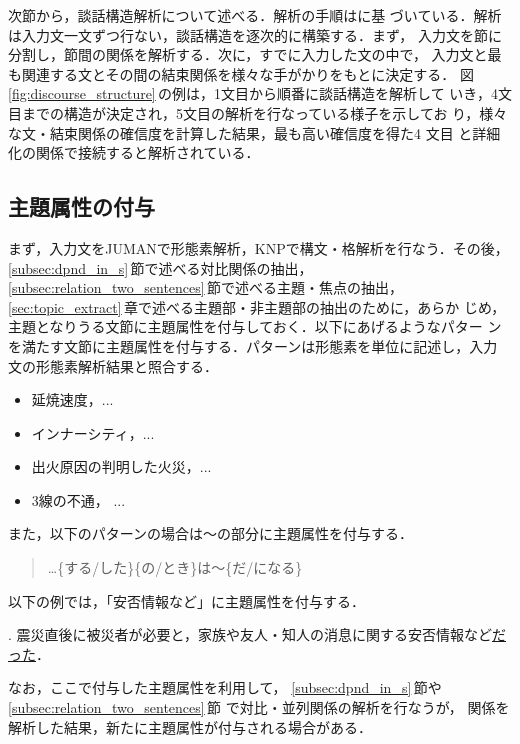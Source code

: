 \vspace{5mm}

次節から，談話構造解析について述べる．解析の手順は\cite{Kurohashi94j}に基
づいている．解析は入力文一文ずつ行ない，談話構造を逐次的に構築する．まず，
入力文を節に分割し，節間の関係を解析する．次に，すでに入力した文の中で，
入力文と最も関連する文とその間の結束関係を様々な手がかりをもとに決定する．
図\ref{fig:discourse_structure}\,の例は，1文目から順番に談話構造を解析して
いき，4文目までの構造が決定され，5文目の解析を行なっている様子を示してお
り，様々な文・結束関係の確信度を計算した結果，最も高い確信度を得た4 文目
と詳細化の関係で接続すると解析されている．


\subsection{主題属性の付与}
\label{subsec:topic_feature}

まず，入力文をJUMANで形態素解析，KNPで構文・格解析を行なう．その後，
\ref{subsec:dpnd_in_s}\,節で述べる対比関係の抽出，
\ref{subsec:relation_two_sentences}\,節で述べる主題・焦点の抽出，
\ref{sec:topic_extract}\,章で述べる主題部・非主題部の抽出のために，あらか
じめ，主題となりうる文節に主題属性を付与しておく．以下にあげるようなパター
ンを満たす文節に主題属性を付与する．パターンは形態素を単位に記述し，入力
文の形態素解析結果と照合する．

\begin{itemize}
 \item 延焼速度，...
 \item インナーシティ，...
 \item 出火原因の判明した火災，...
 \item 3線の不通， ...

\end{itemize}

また，以下のパターンの場合は〜の部分に主題属性を付与する．

\begin{quote}
…\{する/した\}\{の/とき\}は〜\{だ/になる\}
\end{quote}

以下の例では，「安否情報など」に主題属性を付与する．

\ex. 震災直後に被災者が必要と，家族や友人・知人の消息に関する安否情報など\underline{\underline{だった}}．

なお，ここで付与した主題属性を利用して，
\ref{subsec:dpnd_in_s}\,節や\ref{subsec:relation_two_sentences}\,節
で対比・並列関係の解析を行なうが，
関係を解析した結果，新たに主題属性が付与される場合がある．

